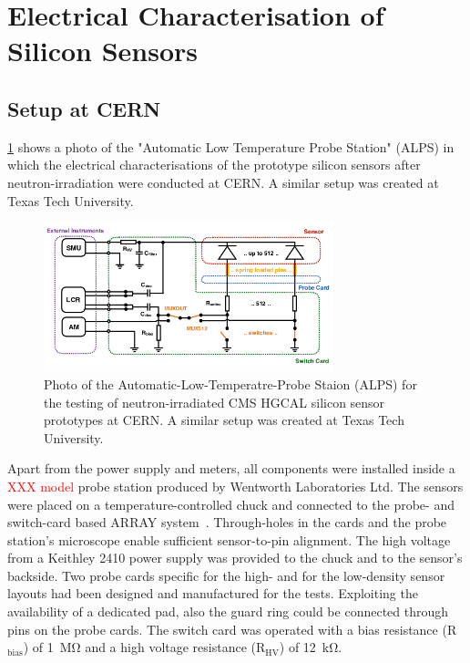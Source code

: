 \section{Electrical Characterisation of Silicon Sensors}
\label{sec:setup}
\subsection{Setup at CERN}
\label{subsec:setup_alps}
\ref{fig:ALPS_setup} shows a photo of the "Automatic Low Temperature Probe Station" (ALPS) in which the electrical characterisations of the prototype silicon sensors after neutron-irradiation were conducted at CERN. 
A similar setup was created at Texas Tech University.
\begin{figure}[h]
	\centering
	\includegraphics[width=0.75\textwidth]{figures/circuit_cards_updated.png}
	\caption{
		Photo of the Automatic-Low-Temperatre-Probe Staion (ALPS) for the testing of neutron-irradiated CMS HGCAL silicon sensor prototypes at CERN. 
		A similar setup was created at Texas Tech University.
	}
	\label{fig:ALPS_setup}
\end{figure}
Apart from the power supply and meters, all components were installed inside a \textcolor{red}{XXX model} probe station produced by Wentworth Laboratories Ltd.
The sensors were placed on a temperature-controlled chuck and connected to the probe- and switch-card based ARRAY system~\cite{pitters:array2019}.
Through-holes in the cards and the probe station's microscope  enable sufficient sensor-to-pin alignment. 
The high voltage from a Keithley 2410 power supply was provided to the chuck and to the sensor's backside.
Two probe cards specific for the high- and for the low-density sensor layouts had been designed and manufactured for the tests.
Exploiting the availability of a dedicated pad, also the guard ring could be connected through pins on the probe cards.
The switch card was operated with a bias resistance (R$_\text{bias}$) of \SI{1}{\mega\ohm} and a high voltage resistance (R$_\text{HV}$) of \SI{12}{\kilo\ohm}.
